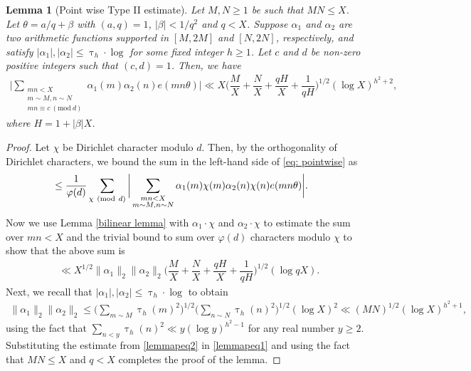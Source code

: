 \documentclass[12pt]{amsart}
\numberwithin{equation}{section}
\newtheorem{lemma}[theorem]{Lemma}
\theoremstyle{remark}
\theoremstyle{definition}
\newcommand{\imod}[1]{\ (\mathrm{mod}\ #1)}
\begin{document}
\begin{lemma}[Point wise Type II estimate]\label{lemmatypeIIpointwise}
Let $M, N\geq 1$ be such that $MN\leq X$. Let $\theta=a/q+\beta$ with $(a, q)=1$, $\lvert \beta \rvert <1/q^2$ and $q<X$. Suppose ${\alpha}_1$ and ${\alpha}_2$ are two arithmetic functions supported in $[M, 2M]$ and $[N, 2N]$, respectively, and satisfy $|{\alpha}_1|, |{\alpha}_2| \leq \uptau_h\cdot \log $  for some fixed integer $h\geq 1$. Let $c$ and $d$ be non-zero positive integers such that $(c, d)=1$. Then, we have
\begin{align}\label{eq: pointwise}
\bigg\lvert\sum_{\substack{mn <X\\m\sim M, n\sim N\\mn\equiv c\imod d}}{\alpha}_1(m){\alpha}_2(n)e(mn\theta)\bigg\rvert\ll X\bigg(\dfrac{M}{X}+\dfrac{N}{X}+\dfrac{qH}{X} + \dfrac{1}{qH}\bigg)^{1/2}(\log X)^{h^2 + 2},
\end{align}
where $H=1+|\beta|X$.

\end{lemma}


\begin{proof}
Let $\chi$ be Dirichlet character modulo $d$. Then, by the orthogonality of Dirichlet characters, we bound the sum in the left-hand side of \eqref{eq: pointwise} as
\begin{align}
\notag &\leq \dfrac{1}{\varphi(d)}\sum_{\chi\imod d}\bigg\lvert\sum_{\substack{mn <X\\m\sim M, n\sim N}}{\alpha}_1(m)\chi(m){\alpha}_2(n)\chi(n)e(mn\theta)\bigg \rvert.
\end{align}
Now we use Lemma \ref{bilinear lemma} with ${\alpha}_1\cdot \chi$ and ${\alpha}_2\cdot \chi$ to estimate the sum over $mn <X$  and the trivial bound to sum over $\varphi(d)$ characters modulo $\chi$ to show that the above sum is
\begin{align}
\label{lemmapeq1} &\ll X^{1/2}\lVert{\alpha}_1\rVert_2\lVert {\alpha}_2\rVert_2\bigg(\dfrac{M}{X} + \dfrac{N}{X} + \dfrac{qH}{X} + \dfrac{1}{qH}\bigg)^{1/2}(\log qX).
\end{align}
Next, we recall that $|{\alpha}_1|, |{\alpha}_2|\leq \uptau_h \cdot \log $ to obtain
\begin{align}
\label{lemmapeq2}\lVert{\alpha}_1\rVert_2\lVert{\alpha}_2\rVert_2 \leq \bigg(\sum_{m\sim M}\uptau_h(m)^2\bigg)^{1/2}\bigg(\sum_{n\sim N}\uptau_h(n)^2\bigg)^{1/2}(\log X)^2 \ll (MN)^{1/2}(\log X)^{h^2+1},
\end{align}
using the fact that $\sum_{n< y}\uptau_h(n)^2 \ll y(\log y)^{h^2-1}$ for any real number $y\geq 2$.
Substituting the estimate from \eqref{lemmapeq2} in \eqref{lemmapeq1} and using the fact that $MN\leq X$ and $q< X$ completes the proof of the lemma.
\end{proof}
\end{document}
